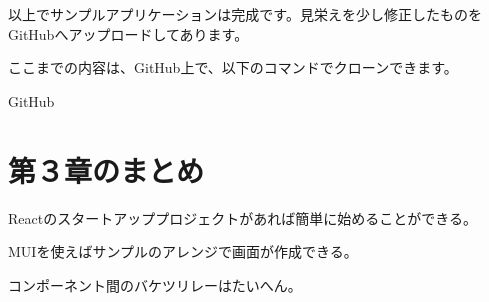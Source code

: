 以上でサンプルアプリケーションは完成です。見栄えを少し修正したものをGitHubへアップロードしてあります。

\begin{starternote}[]{}

ここまでの内容は、GitHub上で、以下のコマンドでクローンできます。

\def\startercodeblockfontsize{}
\begin{starterterminal}[]{GitHub}\end{starterterminal}
\end{starternote}

\section{第３章のまとめ}
\keeplastskip{
  \label{sec:3-5}
  \label{sec03-sammary}
  \par\nobreak
}

\begin{starteritemize}
\item Reactのスタートアッププロジェクトがあれば簡単に始めることができる。
\item MUIを使えばサンプルのアレンジで画面が作成できる。
\item コンポーネント間のバケツリレーはたいへん。
\end{starteritemize}
